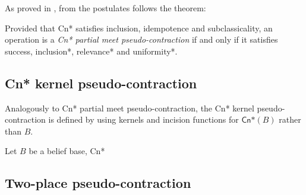 As proved in \citet{Santos2016}, from the postulates follows the theorem:

\begin{theorem}
    Provided that \textsf{Cn*} satisfies inclusion, idempotence and subclassicality, an operation is a \textit{\textsf{Cn*} partial meet pseudo-contraction} if and only if it satisfies success, inclusion*, relevance* and uniformity*. 
\end{theorem}

\subsection{\textsf{Cn*} kernel pseudo-contraction}
Analogously to \textsf{Cn*} partial meet pseudo-contraction, the \textsf{Cn*} kernel pseudo-contraction is defined by using kernels and incision functions for $\textsf{Cn*}(B)$ rather than $B$.
\begin{definition}
    Let $B$ be a belief base, \textsf{Cn*}
\end{definition}

\subsection{Two-place pseudo-contraction}

